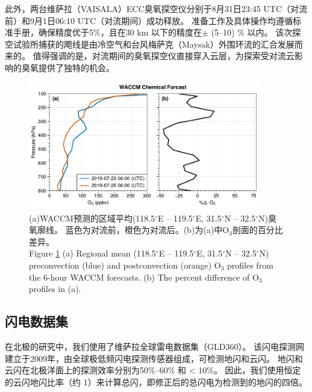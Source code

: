 此外，两台维萨拉（VAISALA）ECC臭氧探空仪分别于8月31日23:45 UTC（对流前）和9月1日06:10 UTC（对流期间）成功释放。
准备工作及具体操作均遵循标准手册，确保精度优于5\%，且在30 km 以下的精度在$\pm$ (5--10) \% 以内\citep{Smit.2007}。
该次探空试验所捕获的飑线是由冷空气和台风梅萨克（Maysak）外围环流的汇合发展而来的。
值得强调的是，对流期间的臭氧探空仪直接穿入云层，为探索受对流云影响的臭氧提供了独特的机会。



\begin{figure}[htbp]
\centering
\includegraphics[width=0.9\textwidth]{./figures/waccm_forcast_o3.pdf}
\caption{(a)WACCM预测的区域平均(118.5$^{\circ}$E -- 119.5$^{\circ}$E, 31.5$^{\circ}$N – 32.5$^{\circ}$N)臭氧廓线。
蓝色为对流前，橙色为对流后。(b)为(a)中O$_3$剖面的百分比差异。\\
Figure \ref{fig:waccm_forcast_o3} (a) Regional mean (118.5$^{\circ}$E – 119.5$^{\circ}$E, 31.5$^{\circ}$N – 32.5$^{\circ}$N)
preconvection (blue) and postconvection (orange) O$_3$ profiles from the 6-hour WACCM forecasts.
(b) The percent difference of O$_3$ profiles in (a).
}
\label{fig:waccm_forcast_o3}
\end{figure}

\subsection{闪电数据集}

在北极的研究中，我们使用了维萨拉全球雷电数据集（GLD360）。
该闪电探测网建立于2009年，由全球极低频闪电探测传感器组成，可检测地闪和云闪\citep{Said.2010,Said.2013,Said.2017}。
地闪和云闪在北极洋面上的探测效率分别为50\%--60\% 和 < 10\%\citep{Vagasky.2022}。
因此，我们使用恒定的云闪地闪比率（约 1）来计算总闪，即修正后的总闪电为检测到的地闪的四倍\citep{Mackerras.1994,Prentice.1977}。

